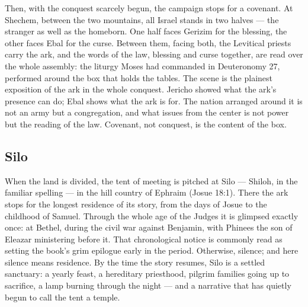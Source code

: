 Then, with the conquest scarcely begun, the campaign stops for a covenant.
At Shechem, between the two mountains, all Israel stands in two halves ---
the stranger as well as the homeborn. One half faces Gerizim for the
blessing, the other faces Ebal for the curse. Between them, facing both, the
Levitical priests carry the ark, and the words of the law, blessing and
curse together, are read over the whole assembly: the liturgy Moses had
commanded in Deuteronomy 27, performed around the box that holds the
tables. The scene is the plainest
exposition of the ark in the whole conquest. Jericho showed what the ark's
presence can do; Ebal shows what the ark is for. The nation arranged around
it is not an army but a congregation, and what issues from the center is not
power but the reading of the law. Covenant, not conquest, is the content of
the box.

\subsection{Silo}

When the land is divided, the tent of meeting is pitched at Silo --- Shiloh,
in the familiar spelling --- in the hill country of Ephraim (Josue 18:1).
There the ark stops for the longest residence of its story, from the days of
Josue to the childhood of Samuel. Through the whole age of the Judges it is
glimpsed exactly once: at Bethel, during the civil war against Benjamin,
with Phinees the son of Eleazar ministering before it. That chronological
notice is commonly read as setting the book's grim epilogue early in the
period.
Otherwise, silence; and here silence means residence. By the time the story
resumes, Silo is a settled sanctuary: a yearly feast, a hereditary
priesthood, pilgrim families going up to sacrifice, a lamp burning through
the night --- and a narrative that has quietly begun to call the tent a
temple.

